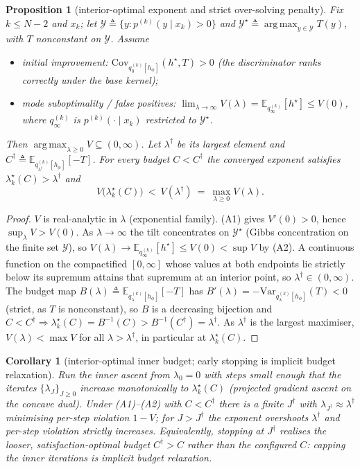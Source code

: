 \documentclass[11pt]{article}
\newcommand{\E}{\mathbb{E}}
\newcommand{\Var}{\mathrm{Var}}
\newcommand{\Cov}{\mathrm{Cov}}
\newcommand{\hs}{h^\star}
\DeclareMathOperator*{\argmax}{arg\,max}
\theoremstyle{plain}
\newtheorem{proposition}{Proposition}
\newtheorem{corollary}{Corollary}
\theoremstyle{definition}
\theoremstyle{remark}
\begin{document}
\begin{proposition}[interior-optimal exponent and strict over-solving penalty]
\label{prop:eta-oversolve}
Fix $k\le N-2$ and $x_k$; let $\mathcal Y\triangleq\{y:p^{(k)}(y\mid x_k)>0\}$ and
$\mathcal Y^\star\triangleq\argmax_{y\in\mathcal Y}T(y)$, with $T$ nonconstant on $\mathcal Y$.
Assume
\begin{itemize}
\item[\textup{(A1)}] \emph{initial improvement:} $\Cov_{q^{(k)}_0[h_\phi]}(\hs,T)>0$ (the
discriminator ranks correctly under the base kernel);
\item[\textup{(A2)}] \emph{mode suboptimality / false positives:}
$\displaystyle\lim_{\lambda\to\infty}V(\lambda)=\E_{q^{(k)}_\infty}[\hs]\le V(0)$, where
$q^{(k)}_\infty$ is $p^{(k)}(\cdot\mid x_k)$ restricted to $\mathcal Y^\star$.
\end{itemize}
Then $\argmax_{\lambda\ge0}V\subseteq(0,\infty)$. Let $\lambda^\dagger$ be its largest element
and $C^\dagger\triangleq\E_{q^{(k)}_{\lambda^\dagger}[h_\phi]}[-T]$. For every budget
$C<C^\dagger$ the converged exponent satisfies $\lambda^\star_k(C)>\lambda^\dagger$ and
\[
V\big(\lambda^\star_k(C)\big)\ <\ V(\lambda^\dagger)\ =\ \max_{\lambda\ge0}V(\lambda).
\]
\end{proposition}
\begin{proof}
$V$ is real-analytic in $\lambda$ (exponential family). (A1) gives $V'(0)>0$, hence
$\sup_\lambda V>V(0)$. As $\lambda\to\infty$ the tilt concentrates on $\mathcal Y^\star$ (Gibbs
concentration on the finite set $\mathcal Y$), so $V(\lambda)\to\E_{q^{(k)}_\infty}[\hs]\le
V(0)<\sup V$ by (A2). A continuous function on the compactified $[0,\infty]$ whose values at
both endpoints lie strictly below its supremum attains that supremum at an interior point, so
$\lambda^\dagger\in(0,\infty)$. The budget map $B(\lambda)\triangleq\E_{q^{(k)}_\lambda[h_\phi]}[-T]$
has $B'(\lambda)=-\Var_{q^{(k)}_\lambda[h_\phi]}(T)<0$ (strict, as $T$ is nonconstant), so $B$ is
a decreasing bijection and $C<C^\dagger\Rightarrow\lambda^\star_k(C)=B^{-1}(C)>B^{-1}(C^\dagger)=\lambda^\dagger$.
As $\lambda^\dagger$ is the largest maximiser, $V(\lambda)<\max V$ for all $\lambda>\lambda^\dagger$,
in particular at $\lambda^\star_k(C)$.
\end{proof}

\begin{corollary}[interior-optimal inner budget; early stopping is implicit budget relaxation]
\label{cor:Jdagger}
Run the inner ascent from $\lambda_0=0$ with steps small enough that the iterates
$\{\lambda_J\}_{J\ge0}$ increase monotonically to $\lambda^\star_k(C)$ (projected gradient ascent
on the concave dual). Under (A1)--(A2) with $C<C^\dagger$ there is a finite $J^\dagger$ with
$\lambda_{J^\dagger}\approx\lambda^\dagger$ minimising per-step violation $1-V$; for $J>J^\dagger$
the exponent overshoots $\lambda^\dagger$ and per-step violation strictly increases. Equivalently,
stopping at $J^\dagger$ realises the looser, satisfaction-optimal budget $C^\dagger>C$ rather than
the configured $C$: \emph{capping the inner iterations is implicit budget relaxation.}
\end{corollary}
\end{document}
